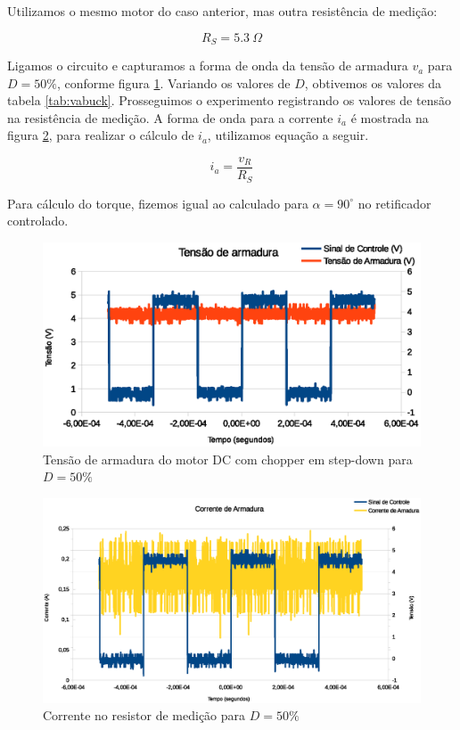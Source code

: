 \documentclass{article}
\begin{document}
Utilizamos o mesmo motor do caso anterior, mas outra resistência de medição:

\begin{equation}
R_S=5.3\ \Omega
\end{equation}

Ligamos o circuito e capturamos a forma de onda da tensão de armadura $v_a$ para $D=50\%$, conforme figura \ref{fig:vabuck}. Variando os valores de $D$, obtivemos os valores da tabela \ref{tab:vabuck}. Prosseguimos o experimento registrando os valores de tensão na resistência de medição. A forma de onda para a corrente $i_a$ é mostrada na figura \ref{fig:iabuck}, para realizar o cálculo de $i_a$, utilizamos equação a seguir.

\begin{equation}
i_a=\frac{v_R}{R_S}
\end{equation}

Para cálculo do torque, fizemos igual ao calculado para $\alpha=90^\circ$ no retificador controlado.

\begin{figure}[H]
	\centering
	\includegraphics[width=\linewidth]{Dados/Buck/va}
	\caption{Tensão de armadura do motor DC com chopper em step-down para $D=50\%$}
	\label{fig:vabuck}
\end{figure}

\begin{figure}[H]
	\centering
	\includegraphics[width=\linewidth]{Dados/Buck/ia}
	\caption{Corrente no resistor de medição para $D=50\%$}
	\label{fig:iabuck}
\end{figure}
\end{document}
